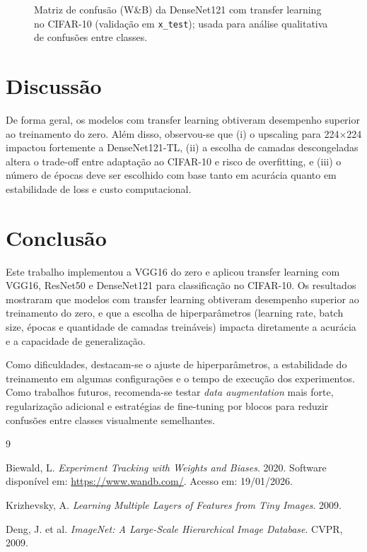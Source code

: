 \documentclass[12pt,a4paper]{article}
\newcommand{\dataRelatorio}{19/01/2026}
\begin{document}
\begin{figure}[H]
\centering
{}
\caption{Matriz de confusão (W\&B) da DenseNet121 com transfer learning no CIFAR-10 (validação em \texttt{x\_test}); usada para análise qualitativa de confusões entre classes.}
\label{fig:confusao_densenet121_tl}
\end{figure}

\section{Discussão}
De forma geral, os modelos com transfer learning obtiveram desempenho superior ao treinamento do zero.
Além disso, observou-se que (i) o upscaling para 224$\times$224 impactou fortemente a DenseNet121-TL, (ii) a escolha de camadas descongeladas altera o trade-off entre adaptação ao CIFAR-10 e risco de overfitting, e (iii) o número de épocas deve ser escolhido com base tanto em acurácia quanto em estabilidade de loss e custo computacional.

\section{Conclusão}
Este trabalho implementou a VGG16 do zero e aplicou transfer learning com VGG16, ResNet50 e DenseNet121 para classificação no CIFAR-10.
Os resultados mostraram que modelos com transfer learning obtiveram desempenho superior ao treinamento do zero, e que a escolha de hiperparâmetros (learning rate, batch size, épocas e quantidade de camadas treináveis) impacta diretamente a acurácia e a capacidade de generalização.

Como dificuldades, destacam-se o ajuste de hiperparâmetros, a estabilidade do treinamento em algumas configurações e o tempo de execução dos experimentos.
Como trabalhos futuros, recomenda-se testar \textit{data augmentation} mais forte, regularização adicional e estratégias de fine-tuning por blocos para reduzir confusões entre classes visualmente semelhantes.

\begin{thebibliography}{9}

Biewald, L. \textit{Experiment Tracking with Weights and Biases}. 2020. Software disponível em: \url{https://www.wandb.com/}. Acesso em: \dataRelatorio. %

Krizhevsky, A. \textit{Learning Multiple Layers of Features from Tiny Images}. 2009.

Deng, J. et al. \textit{ImageNet: A Large-Scale Hierarchical Image Database}. CVPR, 2009.

\end{thebibliography}
\end{document}
